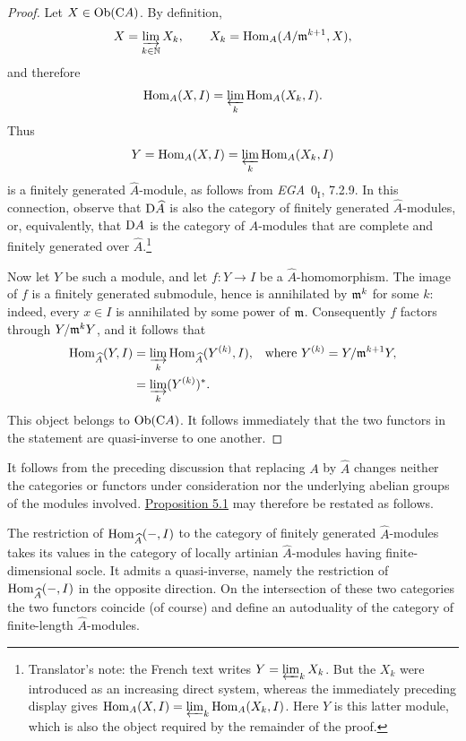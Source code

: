 \begin{proof}
Let $X\in\operatorname{Ob}(\mathrm C A)$. By definition,
\[
  X=\varinjlim_{k\in\mathbb N}X_k,
  \qquad
  X_k=\operatorname{Hom}_A(A/\mathfrak m^{k+1},X),
\]
and therefore
\[
  \operatorname{Hom}_A(X,I)=\varprojlim_k\operatorname{Hom}_A(X_k,I).
\]
Thus
\[
  Y=\operatorname{Hom}_A(X,I)=\varprojlim_k\operatorname{Hom}_A(X_k,I)
\]
is a finitely generated $\widehat A$-module, as follows from
\emph{EGA}~$0_{\mathrm I}$, 7.2.9. In this connection, observe that $\mathrm D\widehat A$
is also the category of finitely generated $\widehat A$-modules, or,
equivalently, that $\mathrm D A$ is the category of $A$-modules that are complete and
finitely generated over $\widehat A$.\footnote{Translator's note: the French text
writes $Y=\varprojlim_k X_k$. But the $X_k$ were introduced as
an increasing direct system, whereas the immediately preceding display gives
$\operatorname{Hom}_A(X,I)=\varprojlim_k\operatorname{Hom}_A(X_k,I)$. Here $Y$ is this latter
module, which is also the object required by the remainder of the proof.}

Now let $Y$ be such a module, and let $f\colon Y\to I$ be a
$\widehat A$-homomorphism. The image of $f$ is a finitely generated
submodule, hence is annihilated by $\mathfrak m^k$ for some $k$: indeed, every
$x\in I$ is annihilated by some power of $\mathfrak m$. Consequently $f$ factors
through $Y/\mathfrak m^kY$, and it follows that
\begin{align*}
  \operatorname{Hom}_{\widehat A}(Y,I)
    &=\varinjlim_k\operatorname{Hom}_{\widehat A}(Y^{(k)},I),
      &\text{where }Y^{(k)}&=Y/\mathfrak m^{k+1}Y,\\
    &=\varinjlim_k (Y^{(k)})^*.
\end{align*}
This object belongs to $\operatorname{Ob}(\mathrm C A)$. It follows immediately that
the two functors in the statement are quasi-inverse to one another.
\end{proof}


It follows from the preceding discussion that replacing $A$ by $\widehat A$
changes neither the categories or functors under consideration nor the
underlying abelian groups of the modules involved. \hyperref[IV.5.1]{Proposition 5.1} may
therefore be restated as follows.

The restriction of $\operatorname{Hom}_{\widehat A}(-,I)$ to the category of finitely
generated $\widehat A$-modules takes its values in the category of locally
artinian $\widehat A$-modules having finite-dimensional socle. It admits a
quasi-inverse, namely the restriction of $\operatorname{Hom}_{\widehat A}(-,I)$ in the
opposite direction. On the intersection of these two categories the two
functors coincide (of course) and define an autoduality of the category of
finite-length $\widehat A$-modules.


